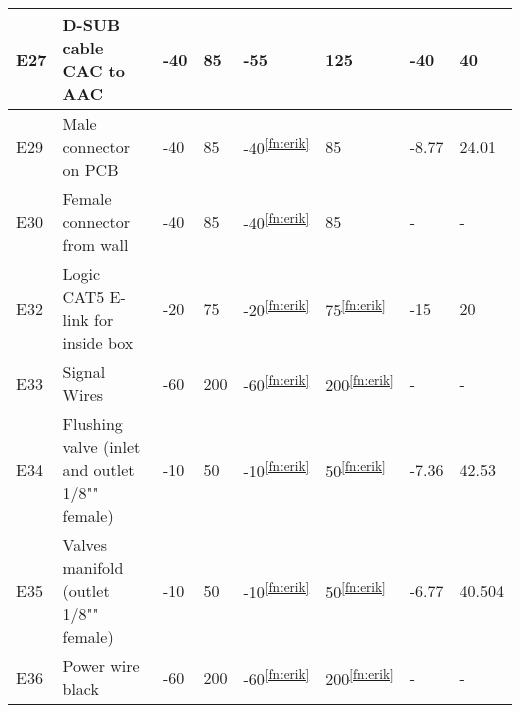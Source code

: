 \begin{longtable}{|m{1cm}|m{3.5cm}|m{1.3cm}|m{1.3cm}|m{1.4cm}|m{1.3cm}|m{1.3cm}|m{1.3cm}|}
E27 & D-SUB cable CAC to AAC & -40 & 85 & -55 & 125 & -40 & 40 \\ \hline
E29 & Male connector on PCB & -40 & 85 & -40\textsuperscript{\ref{fn:erik}} & 85 & -8.77 & 24.01 \\ \hline
E30 & Female connector from wall & -40 & 85 & -40\textsuperscript{\ref{fn:erik}} & 85 & - & - \\ \hline
E32 & Logic CAT5 E-link for inside box &-20 & 75 & -20\textsuperscript{\ref{fn:erik}} & 75\textsuperscript{\ref{fn:erik}} & -15 & 20 \\ \hline
E33 & Signal Wires & -60 & 200 & -60\textsuperscript{\ref{fn:erik}} & 200\textsuperscript{\ref{fn:erik}} & - & - \\ \hline
E34 & Flushing valve (inlet and outlet 1/8"" female) & -10 & 50 & -10\textsuperscript{\ref{fn:erik}} & 50\textsuperscript{\ref{fn:erik}} & -7.36 & 42.53 \\ \hline
E35 & Valves manifold (outlet 1/8"" female) & -10 & 50 & -10\textsuperscript{\ref{fn:erik}} & 50\textsuperscript{\ref{fn:erik}} & -6.77 & 40.504 \\ \hline
E36 & Power wire black & -60 & 200 & -60\textsuperscript{\ref{fn:erik}} & 200\textsuperscript{\ref{fn:erik}} & - & - \\ \hline

\end{longtable}
